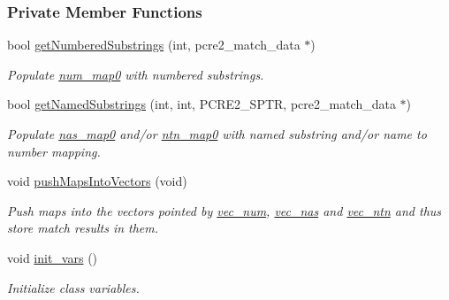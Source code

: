 \subsubsection*{Private Member Functions}
\begin{DoxyCompactItemize}
\item 
bool \hyperlink{classjpcre2_1_1RegexMatch_a5a54fd563812c091b9567569cebe175c_a5a54fd563812c091b9567569cebe175c}{get\+Numbered\+Substrings} (int, pcre2\+\_\+match\+\_\+data $\ast$)
\begin{DoxyCompactList}\small\item\em Populate \hyperlink{classjpcre2_1_1RegexMatch_a94ad930ea8cb22873737fda344bae508}{num\+\_\+map0} with numbered substrings. \end{DoxyCompactList}\item 
bool \hyperlink{classjpcre2_1_1RegexMatch_ab5eec3f2e862236626043c84570f000b_ab5eec3f2e862236626043c84570f000b}{get\+Named\+Substrings} (int, int, P\+C\+R\+E2\+\_\+\+S\+P\+TR, pcre2\+\_\+match\+\_\+data $\ast$)
\begin{DoxyCompactList}\small\item\em Populate \hyperlink{classjpcre2_1_1RegexMatch_a36749947847f266de03c3991ac88a694}{nas\+\_\+map0} and/or \hyperlink{classjpcre2_1_1RegexMatch_a1c790683d023313967ce80db6045419f}{ntn\+\_\+map0} with named substring and/or name to number mapping. \end{DoxyCompactList}\item 
\hypertarget{classjpcre2_1_1RegexMatch_aeeffc8edc43a8e5d1d24ae4055213730}{}\label{classjpcre2_1_1RegexMatch_aeeffc8edc43a8e5d1d24ae4055213730} 
void \hyperlink{classjpcre2_1_1RegexMatch_aeeffc8edc43a8e5d1d24ae4055213730}{push\+Maps\+Into\+Vectors} (void)
\begin{DoxyCompactList}\small\item\em Push maps into the vectors pointed by \hyperlink{classjpcre2_1_1RegexMatch_a836705e0444568c78abaab4c8e351335}{vec\+\_\+num}, \hyperlink{classjpcre2_1_1RegexMatch_a812b57dc08fdc0caa93a1b508ef8242c}{vec\+\_\+nas} and \hyperlink{classjpcre2_1_1RegexMatch_a86ef413ab6d237972af858be26ff77f7}{vec\+\_\+ntn} and thus store match results in them. \end{DoxyCompactList}\item 
void \hyperlink{classjpcre2_1_1RegexMatch_a3da6a2319cd577d7f2f10c66dcf59a99_a3da6a2319cd577d7f2f10c66dcf59a99}{init\+\_\+vars} ()
\begin{DoxyCompactList}\small\item\em Initialize class variables. \end{DoxyCompactList}\item 

\end{DoxyCompactItemize}
